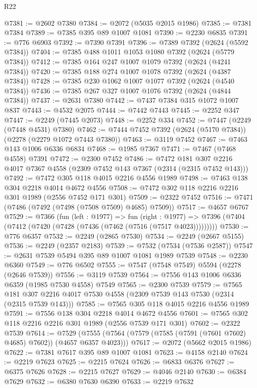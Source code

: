 \begin{lexlean}{R22}
\begin{coremodule}
@7381 := @2602 @7380
@7384 := @2072 (@5035 @2015 @1986)
@7385 := @7381 @7384
@7389 := @7385 @395 @89 @1007 @1081
@7390 := @2230 @6835
@7391 := @776 @6903
@7392 := @7390 @7391
@7396 := @7389 @7392 (@2624 (@5592 @7384))
@7404 := @7385 @488 @1011 @1053 @1080 @7392 (@2624 (@5779 @7384))
@7412 := @7385 @164 @247 @1007 @1079 @7392 (@2624 (@4241 @7384))
@7420 := @7385 @188 @274 @1007 @1078 @7392 (@2624 (@4387 @7384))
@7428 := @7385 @230 @1062 @1007 @1077 @7392 (@2624 (@4540 @7384))
@7436 := @7385 @267 @327 @1007 @1076 @7392 (@2624 (@4844 @7384))
@7437 := @2631 @7380
@7442 := @7437 @7384 @315 @1072 @1007 @837
@7443 := @4532 @2075
@7444 := @7442 @7443
@7445 := @2252 @347
@7447 := @2249 (@7445 @2073)
@7448 := @2252 @334
@7452 := @7447 (@2249 (@7448 @4531) @7380)
@7462 := @7444 @7452 @7392 (@2624 (@5170 @7384)) (@2278 (@2279 @1072 @7443 @7380))
@7463 := @3119 @7452
@7467 := @7463 @143 @1006 @6336 @6834
@7468 := @1985 @7367
@7471 := @7467 (@7468 @4558) @7391
@7472 := @2300 @7452
@7486 := @7472 @181 @307 @2216 @4017 @7367 @4558 (@2309 @7452 @143 @7367 (@2314 (@2315 @7452 @143)))
@7492 := @7472 @305 @118 @4015 @2216 @4556 @1989
@7498 := @7463 @138 @304 @2218 @4014 @4672 @4556
@7508 := @7472 @302 @118 @2216 @2216 @301 @1989 (@2556 @7452 @171 @301)
@7509 := @2322 @7452
@7516 := @7471 (@7486 (@7492 (@7498 (@7508 @7509) @4685) @7509))
@7517 := @4657 @6767
@7529 := @7366
    (fun (left : @1977) =>
    fun (right : @1977) =>
    @7396 (@7404 (@7412 (@7420 (@7428 (@7436 (@7462 (@7516 (@7517 @4023)))))))))
@7530 := @776 @6357
@7532 := @2249 (@2865 @7530)
@7534 := @2249 (@2667 @5155)
@7536 := @2249 (@2357 @2183)
@7539 := @7532 (@7534 (@7536 @2587))
@7547 := @2631 @7539 @5494 @395 @89 @1007 @1081 @1989 @7539
@7548 := @2230 @6360
@7549 := @776 @6502
@7555 := @7547 (@7548 @7549) @5594 (@2278 (@2646 @7539))
@7556 := @3119 @7539
@7564 := @7556 @143 @1006 @6336 @6359 (@1985 @7530 @4558) @7549
@7565 := @2300 @7539
@7579 := @7565 @181 @307 @2216 @4017 @7530 @4558 (@2309 @7539 @143 @7530 (@2314 (@2315 @7539 @143)))
@7585 := @7565 @305 @118 @4015 @2216 @4556 @1989
@7591 := @7556 @138 @304 @2218 @4014 @4672 @4556
@7601 := @7565 @302 @118 @2216 @2216 @301 @1989 (@2556 @7539 @171 @301)
@7602 := @2322 @7539
@7614 := @7529 (@7555 (@7564 (@7579 (@7585 (@7591 (@7601 @7602) @4685) @7602)) (@4657 @6357 @4023)))
@7617 := @2072 (@5662 @2015 @1986)
@7622 := @7381 @7617 @395 @89 @1007 @1081
@7623 := @4158 @2140
@7624 := @2219 @7623
@7625 := @2215 @7624
@7626 := @6833 @6376
@7627 := @6375 @7626
@7628 := @2215 @7627
@7629 := @4046 @2140
@7630 := @6384 @7629
@7632 := @6380 @7630 @6390
@7633 := @2219 @7632

\end{coremodule}
\end{lexlean}
